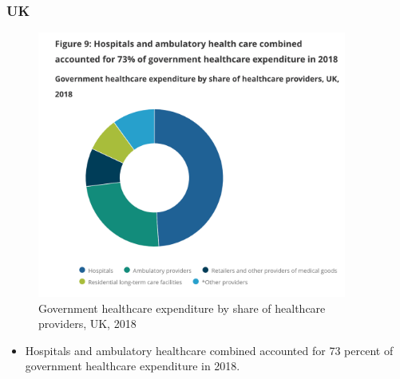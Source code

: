         \subsubsection{UK}
        \begin{figure}[H]%
                \centering
                \includegraphics[width=4in]{images/ch3/18.png}
                \caption{Government healthcare expenditure by share of healthcare providers, UK, 2018}
            \end{figure} 
        \begin{itemize}           
        \item Hospitals and ambulatory healthcare combined accounted for 73 percent of government healthcare expenditure in 2018.
        \end{itemize}  

